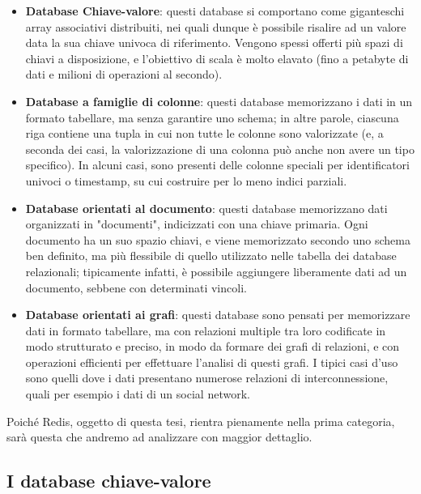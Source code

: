 \begin{itemize}
	\medskip
	\item
	\textbf{Database Chiave-valore}: questi database si comportano come giganteschi array
	associativi distribuiti, nei quali dunque è possibile risalire ad un valore data la
	sua chiave univoca di riferimento. Vengono spessi offerti più spazi di chiavi
	a disposizione, e l'obiettivo di scala è molto elavato (fino a petabyte di dati
	e milioni di operazioni al secondo).

	\item
	\textbf{Database a famiglie di colonne}: questi database memorizzano i dati in un formato
	tabellare, ma senza garantire uno schema; in altre parole, ciascuna riga contiene
	una tupla in cui non tutte le colonne sono valorizzate (e, a seconda dei casi, la
	valorizzazione di una colonna può anche non avere un tipo specifico). In alcuni
	casi, sono presenti delle colonne speciali per identificatori univoci o timestamp,
	su cui costruire per lo meno indici parziali.

	\item
	\textbf{Database orientati al documento}: questi database memorizzano dati organizzati in
	"documenti", indicizzati con una chiave primaria. Ogni documento ha un suo spazio
	chiavi, e viene memorizzato secondo uno schema ben definito, ma più flessibile
	di quello utilizzato nelle tabella dei database relazionali; tipicamente infatti,
	è possibile aggiungere liberamente dati ad un documento, sebbene con determinati
	vincoli.

	\item
	\textbf{Database orientati ai grafi}: questi database sono pensati per memorizzare dati
	in formato tabellare, ma con relazioni multiple tra loro codificate in modo
	strutturato e preciso, in modo da formare dei grafi di relazioni, e con operazioni
	efficienti per effettuare l'analisi di questi grafi. I tipici casi d'uso sono
	quelli dove i dati presentano numerose relazioni di interconnessione, quali per
	esempio i dati di un social network.
\end{itemize}

Poiché Redis, oggetto di questa tesi, rientra pienamente nella prima categoria, sarà
questa che andremo ad analizzare con maggior dettaglio.


\subsection{I database chiave-valore}

